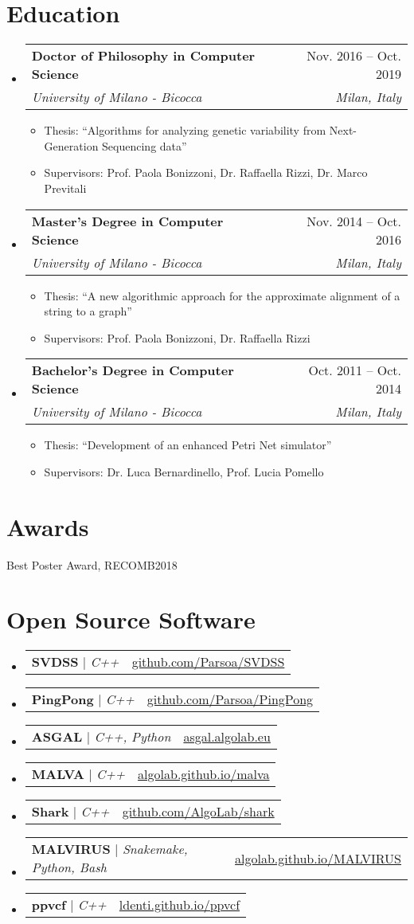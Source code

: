 \documentclass[letterpaper,11pt]{article}
\makeatletter
\newcommand{\resumeItem}[1]{
  \item\small{
    {#1 \vspace{-2pt}}
  }
}
\newcommand{\resumeSubheading}[4]{
  \vspace{-2pt}\item
    \begin{tabular*}{0.97\textwidth}[t]{l@{\extracolsep{\fill}}r}
      \textbf{#1} & #2 \\
      \textit{\small#3} & \textit{\small #4} \\
    \end{tabular*}\vspace{-7pt}
}
\newcommand{\resumeProjectHeading}[2]{
    \item
    \begin{tabular*}{0.97\textwidth}{l@{\extracolsep{\fill}}r}
      \small#1 & #2 \\
    \end{tabular*}\vspace{-7pt}
}
\newcommand{\resumeSubHeadingListStart}{\begin{itemize}[leftmargin=0.15in, label={}]}
\newcommand{\resumeSubHeadingListEnd}{\end{itemize}}
\newcommand{\resumeItemListStart}{\begin{itemize}}
\newcommand{\resumeItemListEnd}{\end{itemize}\vspace{-5pt}}
\makeatother
\begin{document}
\section{Education}
  \resumeSubHeadingListStart
    \resumeSubheading
      {Doctor of Philosophy in Computer Science}{Nov. 2016 -- Oct. 2019}
      {University of Milano - Bicocca}{Milan, Italy}
      \resumeItemListStart
      \resumeItem{Thesis: ``Algorithms for analyzing genetic variability from Next-Generation Sequencing data''}
      \resumeItem{Supervisors: Prof. Paola Bonizzoni, Dr. Raffaella Rizzi, Dr. Marco Previtali}
      \resumeItemListEnd
    \resumeSubheading
      {Master's Degree in Computer Science}{Nov. 2014 -- Oct. 2016}
      {University of Milano - Bicocca}{Milan, Italy}
      \resumeItemListStart
      \resumeItem{Thesis: ``A new algorithmic approach for the approximate alignment of a string to a graph''}
      \resumeItem{Supervisors: Prof. Paola Bonizzoni, Dr. Raffaella Rizzi}
      \resumeItemListEnd
    \resumeSubheading
      {Bachelor's Degree in Computer Science}{Oct. 2011 -- Oct. 2014}
      {University of Milano - Bicocca}{Milan, Italy}
      \resumeItemListStart
      \resumeItem{Thesis: ``Development of an enhanced Petri Net simulator''}
      \resumeItem{Supervisors: Dr. Luca Bernardinello, Prof. Lucia Pomello}
      \resumeItemListEnd
  \resumeSubHeadingListEnd

\section{Awards}
 \begin{itemize}
    \small{
        \item Best Poster Award, RECOMB2018
    }
 \end{itemize}
 
\section{Open Source Software}
    \resumeSubHeadingListStart
      \resumeProjectHeading {\textbf{SVDSS} $|$ \emph{C++}}{\href{https://github.com/Parsoa/SVDSS}{github.com/Parsoa/SVDSS}}
      \resumeProjectHeading {\textbf{PingPong} $|$ \emph{C++}}{\href{https://github.com/Parsoa/PingPong}{github.com/Parsoa/PingPong}}
      \resumeProjectHeading {\textbf{ASGAL} $|$ \emph{C++, Python}}{\href{https://asgal.algolab.eu/}{asgal.algolab.eu}}
      \resumeProjectHeading {\textbf{MALVA} $|$ \emph{C++}}{\href{https://algolab.github.io/malva/}{algolab.github.io/malva}}
      \resumeProjectHeading {\textbf{Shark} $|$ \emph{C++}}{\href{https://github.com/AlgoLab/shark}{github.com/AlgoLab/shark}}
      \resumeProjectHeading {\textbf{MALVIRUS} $|$ \emph{Snakemake, Python, Bash}}{\href{https://algolab.github.io/MALVIRUS/}{algolab.github.io/MALVIRUS}}
      \resumeProjectHeading {\textbf{ppvcf} $|$ \emph{C++}}{\href{https://ldenti.github.io/ppvcf/}{ldenti.github.io/ppvcf}}
    \resumeSubHeadingListEnd
\end{document}
